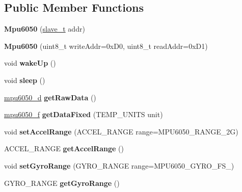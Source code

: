 \subsection*{Public Member Functions}
\begin{DoxyCompactItemize}
\item 
\mbox{\label{classMpu6050_a66c02083300656955c6ab4825a9a2cf7}} 
{\bfseries Mpu6050} (\hyperlink{structslave__t}{slave\+\_\+t} addr)
\item 
\mbox{\label{classMpu6050_ada44fc04a552a9f0ac78e8406958f372}} 
{\bfseries Mpu6050} (uint8\+\_\+t write\+Addr=0x\+D0, uint8\+\_\+t read\+Addr=0x\+D1)
\item 
\mbox{\label{classMpu6050_a066832c484d51f19bca711291eb8b6f6}} 
void {\bfseries wake\+Up} ()
\item 
\mbox{\label{classMpu6050_aad083177a7f103792055e0fffdabc99c}} 
void {\bfseries sleep} ()
\item 
\mbox{\label{classMpu6050_adff3dea805b3277544f2a1055ab88b82}} 
\hyperlink{structmpu6050__d}{mpu6050\+\_\+d} {\bfseries get\+Raw\+Data} ()
\item 
\mbox{\label{classMpu6050_a454db86b0f6deaec49bec03104fbc36b}} 
\hyperlink{structmpu6050__f}{mpu6050\+\_\+f} {\bfseries get\+Data\+Fixed} (T\+E\+M\+P\+\_\+\+U\+N\+I\+TS unit)
\item 
\mbox{\label{classMpu6050_aec4a6223578c5b5ec218c549b529acfc}} 
void {\bfseries set\+Accel\+Range} (A\+C\+C\+E\+L\+\_\+\+R\+A\+N\+GE range=M\+P\+U6050\+\_\+\+R\+A\+N\+G\+E\+\_\+2G)
\item 
\mbox{\label{classMpu6050_a09ea34d6c38da2353cb7162404f08da6}} 
A\+C\+C\+E\+L\+\_\+\+R\+A\+N\+GE {\bfseries get\+Accel\+Range} ()
\item 
\mbox{\label{classMpu6050_a7b9f3b74955abf148a7f7e9a2de00819}} 
void {\bfseries set\+Gyro\+Range} (G\+Y\+R\+O\+\_\+\+R\+A\+N\+GE range=M\+P\+U6050\+\_\+\+G\+Y\+R\+O\+\_\+\+F\+S\+\_)
\item 
\mbox{\label{classMpu6050_a97ff9e30c5af6767b44cce16f317c877}} 
G\+Y\+R\+O\+\_\+\+R\+A\+N\+GE {\bfseries get\+Gyro\+Range} ()
\end{DoxyCompactItemize}
